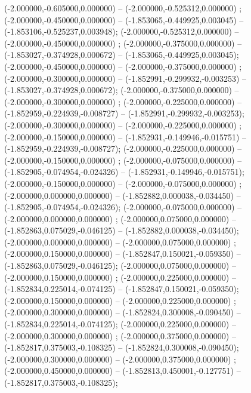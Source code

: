  (-2.000000,-0.605000,0.000000) -- (-2.000000,-0.525312,0.000000) ;
 (-2.000000,-0.450000,0.000000) -- (-1.853065,-0.449925,0.003045) -- (-1.853106,-0.525237,0.003948);
 (-2.000000,-0.525312,0.000000) -- (-2.000000,-0.450000,0.000000) ;
 (-2.000000,-0.375000,0.000000) -- (-1.853027,-0.374928,0.000672) -- (-1.853065,-0.449925,0.003045);
 (-2.000000,-0.450000,0.000000) -- (-2.000000,-0.375000,0.000000) ;
 (-2.000000,-0.300000,0.000000) -- (-1.852991,-0.299932,-0.003253) -- (-1.853027,-0.374928,0.000672);
 (-2.000000,-0.375000,0.000000) -- (-2.000000,-0.300000,0.000000) ;
 (-2.000000,-0.225000,0.000000) -- (-1.852959,-0.224939,-0.008727) -- (-1.852991,-0.299932,-0.003253);
 (-2.000000,-0.300000,0.000000) -- (-2.000000,-0.225000,0.000000) ;
 (-2.000000,-0.150000,0.000000) -- (-1.852931,-0.149946,-0.015751) -- (-1.852959,-0.224939,-0.008727);
 (-2.000000,-0.225000,0.000000) -- (-2.000000,-0.150000,0.000000) ;
 (-2.000000,-0.075000,0.000000) -- (-1.852905,-0.074954,-0.024326) -- (-1.852931,-0.149946,-0.015751);
 (-2.000000,-0.150000,0.000000) -- (-2.000000,-0.075000,0.000000) ;
 (-2.000000,0.000000,0.000000) -- (-1.852882,0.000038,-0.034450) -- (-1.852905,-0.074954,-0.024326);
 (-2.000000,-0.075000,0.000000) -- (-2.000000,0.000000,0.000000) ;
 (-2.000000,0.075000,0.000000) -- (-1.852863,0.075029,-0.046125) -- (-1.852882,0.000038,-0.034450);
 (-2.000000,0.000000,0.000000) -- (-2.000000,0.075000,0.000000) ;
 (-2.000000,0.150000,0.000000) -- (-1.852847,0.150021,-0.059350) -- (-1.852863,0.075029,-0.046125);
 (-2.000000,0.075000,0.000000) -- (-2.000000,0.150000,0.000000) ;
 (-2.000000,0.225000,0.000000) -- (-1.852834,0.225014,-0.074125) -- (-1.852847,0.150021,-0.059350);
 (-2.000000,0.150000,0.000000) -- (-2.000000,0.225000,0.000000) ;
 (-2.000000,0.300000,0.000000) -- (-1.852824,0.300008,-0.090450) -- (-1.852834,0.225014,-0.074125);
 (-2.000000,0.225000,0.000000) -- (-2.000000,0.300000,0.000000) ;
 (-2.000000,0.375000,0.000000) -- (-1.852817,0.375003,-0.108325) -- (-1.852824,0.300008,-0.090450);
 (-2.000000,0.300000,0.000000) -- (-2.000000,0.375000,0.000000) ;
 (-2.000000,0.450000,0.000000) -- (-1.852813,0.450001,-0.127751) -- (-1.852817,0.375003,-0.108325);
